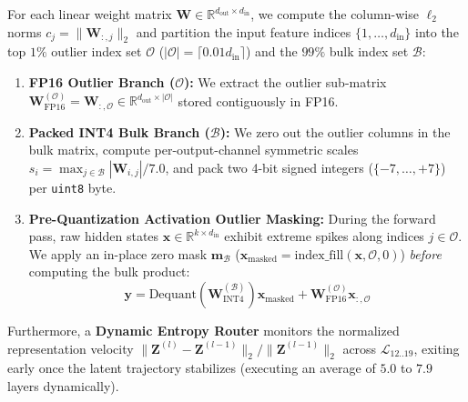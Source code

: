 \documentclass[10pt,twocolumn]{article}
\begin{document}
For each linear weight matrix $\mathbf{W} \in \mathbb{R}^{d_{\text{out}} \times d_{\text{in}}}$, we compute the column-wise $\ell_2$ norms $c_j = \|\mathbf{W}_{:, j}\|_2$ and partition the input feature indices $\{1, \dots, d_{\text{in}}\}$ into the top $1\%$ outlier index set $\mathcal{O}$ ($|\mathcal{O}| = \lceil 0.01 d_{\text{in}} \rceil$) and the $99\%$ bulk index set $\mathcal{B}$:
\begin{enumerate}
    \item \textbf{FP16 Outlier Branch ($\mathcal{O}$):} We extract the outlier sub-matrix $\mathbf{W}_{\text{FP16}}^{(\mathcal{O})} = \mathbf{W}_{:, \mathcal{O}} \in \mathbb{R}^{d_{\text{out}} \times |\mathcal{O}|}$ stored contiguously in FP16.
    \item \textbf{Packed INT4 Bulk Branch ($\mathcal{B}$):} We zero out the outlier columns in the bulk matrix, compute per-output-channel symmetric scales $s_i = \max_{j \in \mathcal{B}} |\mathbf{W}_{i,j}| / 7.0$, and pack two 4-bit signed integers ($\{-7, \dots, +7\}$) per \texttt{uint8} byte.
    \item \textbf{Pre-Quantization Activation Outlier Masking:} During the forward pass, raw hidden states $\mathbf{x} \in \mathbb{R}^{k \times d_{\text{in}}}$ exhibit extreme spikes along indices $j \in \mathcal{O}$. We apply an in-place zero mask $\mathbf{m}_{\mathcal{B}}$ ($\mathbf{x}_{\text{masked}} = \text{index\_fill}(\mathbf{x}, \mathcal{O}, 0)$) \emph{before} computing the bulk product:
    \begin{equation}
        \mathbf{y} = \text{Dequant}\left(\mathbf{W}_{\text{INT4}}^{(\mathcal{B})}\right) \mathbf{x}_{\text{masked}} + \mathbf{W}_{\text{FP16}}^{(\mathcal{O})} \mathbf{x}_{:, \mathcal{O}}
    \end{equation}
\end{enumerate}

Furthermore, a \textbf{Dynamic Entropy Router} monitors the normalized representation velocity $\|\mathbf{Z}^{(l)} - \mathbf{Z}^{(l-1)}\|_2 / \|\mathbf{Z}^{(l-1)}\|_2$ across $\mathcal{L}_{12..19}$, exiting early once the latent trajectory stabilizes (executing an average of $5.0$ to $7.9$ layers dynamically).
\end{document}
